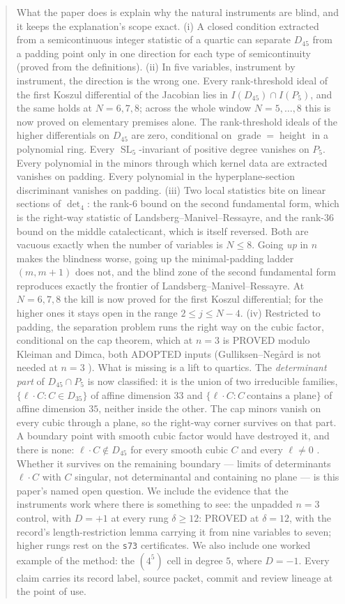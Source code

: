 \documentclass[11pt]{amsart}
\theoremstyle{plain}
\theoremstyle{definition}
\theoremstyle{remark}
\DeclareMathOperator{\SL}{SL}
\newcommand{\Dff}{D_{45}}
\newcommand{\Pf}{P_{5}}
\begin{document}
\begin{abstract}
What the paper does is explain why the natural instruments are blind, and it keeps the
explanation's scope exact. (i) A closed condition extracted from a semicontinuous integer
statistic of a quartic can separate $\Dff$ from a padding point only in one direction for each
type of semicontinuity (proved from the definitions). (ii) In five variables, instrument by
instrument, the direction is the wrong one. Every rank-threshold ideal of the first Koszul
differential of the Jacobian lies in $I(\Dff)\cap I(\Pf)$, and the same holds at
$N=6,7,8$; across the whole window $N=5,\dots,8$ this is now proved on elementary premises
alone. The rank-threshold ideals of the
higher differentials on $\Dff$ are zero, conditional on $\operatorname{grade}=\operatorname{height}$
in a polynomial ring. Every $\SL_5$-invariant of positive degree vanishes on $\Pf$. Every
polynomial in the minors through which kernel data are extracted vanishes on padding. Every
polynomial in the hyperplane-section discriminant vanishes on padding. (iii) Two local
statistics bite on linear sections of $\det_4$: the rank-$6$ bound on the second fundamental
form, which is the right-way statistic of Landsberg--Manivel--Ressayre, and the rank-$36$ bound on the middle
catalecticant, which is itself reversed. Both are vacuous exactly when the number of variables
is $N\le 8$. Going \emph{up} in $n$ makes the blindness worse, going up the minimal-padding
ladder $(m,m+1)$ does not, and the blind zone of the second fundamental form reproduces exactly
the frontier of Landsberg--Manivel--Ressayre. At $N=6,7,8$ the kill is now proved for the first
Koszul differential; for the higher ones it stays open in the range $2\le j\le N-4$. (iv)
Restricted to padding, the separation problem runs the right way on the cubic factor,
conditional on the cap theorem, which at $n=3$ is PROVED modulo Kleiman and Dimca, both ADOPTED
inputs (Gulliksen--Neg\aa rd is not needed at $n=3$ \cite[Prop.~4.23]{Paper1}). What is missing is a lift to quartics. The
\emph{determinant part} of $\Dff\cap\Pf$ is now classified: it is the union of two irreducible
families, $\{\ell\cdot C: C\in D_{35}\}$ of affine dimension $33$ and
$\{\ell\cdot C: C\ \text{contains a plane}\}$ of affine dimension $35$, neither inside the
other. The cap minors vanish on every cubic through a plane, so the right-way corner survives on
that part. A boundary point with smooth cubic factor would have destroyed it, and there is none:
$\ell\cdot C\notin\Dff$ for every smooth cubic $C$ and every $\ell\ne0$ \cite{Paper2}. Whether
it survives on the remaining boundary --- limits of determinants $\ell\cdot C$ with $C$ singular,
not determinantal and containing no plane --- is this paper's named open question. We include the evidence
that the instruments work where there is something to see: the unpadded $n=3$ control, with
$D=+1$ at every rung $\delta\ge12$: PROVED at $\delta=12$, with the record's length-restriction lemma carrying it from nine
variables to seven; higher rungs rest on the \texttt{s73} certificates. We also include one worked example of the method: the
$(4^5)$ cell in degree $5$, where $D=-1$. Every claim carries its record label, source packet,
commit and review lineage at the point of use.
\end{abstract}
\end{document}
